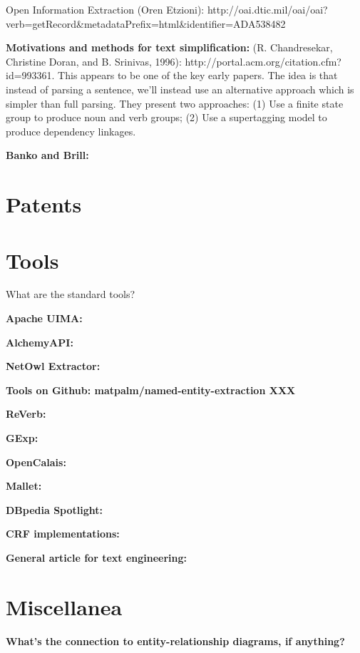 Open Information Extraction (Oren Etzioni):
http://oai.dtic.mil/oai/oai?verb=getRecord\&metadataPrefix=html\&identifier=ADA538482

\textbf{Motivations and methods for text simplification:}
(R. Chandresekar, Christine Doran, and B. Srinivas, 1996):
http://portal.acm.org/citation.cfm?id=993361.  This appears to be one
of the key early papers.  The idea is that instead of parsing a
sentence, we'll instead use an alternative approach which is simpler
than full parsing.  They present two approaches: (1) Use a finite
state group to produce noun and verb groups; (2) Use a supertagging
model to produce dependency linkages.

\textbf{Banko and Brill:}

\section{Patents}


\section{Tools}

What are the standard tools?

\textbf{Apache UIMA:}

\textbf{AlchemyAPI:}

\textbf{NetOwl Extractor:}

\textbf{Tools on Github: matpalm/named-entity-extraction XXX}

\textbf{ReVerb:}

\textbf{GExp:}

\textbf{OpenCalais:}

\textbf{Mallet:}

\textbf{DBpedia Spotlight:}

\textbf{CRF implementations:}

\textbf{General article for text engineering:}

\section{Miscellanea}

\textbf{What's the connection to entity-relationship diagrams, if
  anything?}

